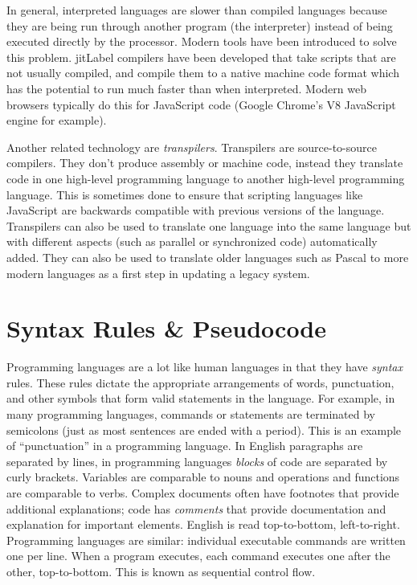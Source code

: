 In general, interpreted languages are slower than compiled languages because
they are being run through another program (the interpreter) instead of
being executed directly by the processor.  Modern tools
have been introduced to solve this problem.  \gls{jitLabel} compilers have
been developed that take scripts that are not usually compiled, and compile
them to a native machine code format which has the potential to run 
much faster than when interpreted.  Modern web browsers typically do this
for JavaScript code (Google Chrome's V8 JavaScript engine for example).

Another related technology are  \emph{transpilers}.  
Transpilers are source-to-source compilers.  They 
don't produce assembly
or machine code, instead they translate code in one high-level programming
language to another high-level programming language.  This is sometimes 
done to ensure that scripting languages
like JavaScript are backwards compatible with previous versions of the language.
Transpilers can also be used to translate one language into the same language
but with different aspects (such as parallel or synchronized code) automatically
added.  They can also be used to translate older languages such as Pascal
to more modern languages as a first step in updating a legacy system.

\section{Syntax Rules \& Pseudocode}

Programming languages are a lot like human languages in that they have 
\emph{syntax} rules.  These rules dictate the appropriate arrangements 
of words, punctuation, and other symbols that form valid statements in the 
language.  For example, in many programming languages, commands or statements 
are terminated by semicolons (just as most sentences are ended 
with a period).  This is an example of ``punctuation'' in a programming 
language.  In English paragraphs are separated by lines, in programming
languages \emph{blocks} of code are separated by curly brackets.  
Variables are comparable to nouns and operations and functions are 
comparable to verbs.  Complex documents often have footnotes that
provide additional explanations; code has \emph{comments} that provide
documentation and explanation for important elements. English is read 
top-to-bottom, left-to-right.  Programming languages 
are similar: individual executable commands are written one per line.  When 
a program executes, each command executes one after the other, top-to-bottom.  
This is known as  sequential control flow.

